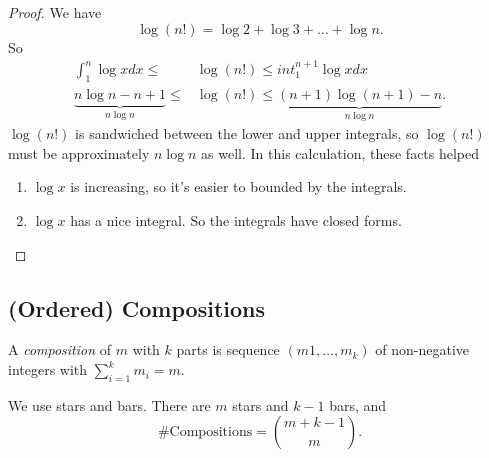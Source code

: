 \begin{proof}
    We have
    \[
        \log (n!) = \log 2 + \log 3 + \ldots + \log n.
    \]
    So
    \begin{align*}
        \int^n_1 \log x dx \leq &\log (n!)\leq int_1^{n+1}\log x dx\\
        \underbrace{n\log n - n + 1}_{n\log n} \leq &\log (n!)\leq \underbrace{(n+1)\log (n+1) - n}_{n\log n}.
    \end{align*}
    \(\log (n!)\) is sandwiched between the lower and upper integrals, so \(\log (n!)\) must be approximately \(n\log n\) as well. In this calculation, these facts helped
    \begin{enumerate}
        \item \(\log x\) is increasing, so it's easier to bounded by the integrals.
        \item \(\log x\) has a nice integral. So the integrals have closed forms.
    \end{enumerate}
\end{proof}
\subsection*{(Ordered) Compositions}
\leavevmode
\begin{definition}
    A \textit{composition} of \(m\) with \(k\) parts is sequence \((m1, \ldots , m_k )\) of non-negative integers with \(\sum\limits_{i=1}^{k} m_i = m\).
\end{definition}
We use stars and bars. There are \(m\) stars and \(k - 1\) bars, and
\[
    \#\text{Compositions} = \binom{m+k-1}{m}.
\]


